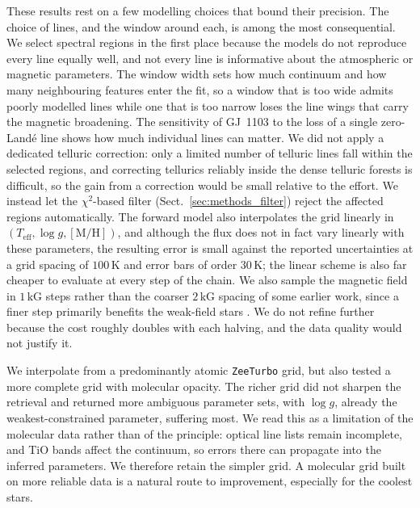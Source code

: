 
These results rest on a few modelling choices that bound their precision. The choice of lines, and the window around each, is among the most consequential. We select spectral regions in the first place because the models do not reproduce every line equally well, and not every line is informative about the atmospheric or magnetic parameters. The window width sets how much continuum and how many neighbouring features enter the fit, so a window that is too wide admits poorly modelled lines while one that is too narrow loses the line wings that carry the magnetic broadening. The sensitivity of GJ~1103 to the loss of a single zero-Landé line shows how much individual lines can matter. We did not apply a dedicated telluric correction: only a limited number of telluric lines fall within the selected regions, and correcting tellurics reliably inside the dense telluric forests is difficult, so the gain from a correction would be small relative to the effort. We instead let the $\chi^2$-based filter (Sect.~\ref{sec:methods_filter}) reject the affected regions automatically. The forward model also interpolates the grid linearly in $(T_\mathrm{eff}, \log g, \mathrm{[M/H]})$, and although the flux does not in fact vary linearly with these parameters, the resulting error is small against the reported uncertainties at a grid spacing of $100\,\mathrm{K}$ and error bars of order $30\,\mathrm{K}$; the linear scheme is also far cheaper to evaluate at every step of the chain. We also sample the magnetic field in $1\,\mathrm{kG}$ steps rather than the coarser $2\,\mathrm{kG}$ spacing of some earlier work, since a finer step primarily benefits the weak-field stars \citep{amateis_2026}. We do not refine further because the cost roughly doubles with each halving, and the data quality would not justify it.


We interpolate from a predominantly atomic \texttt{ZeeTurbo} grid, but also
tested a more complete grid with molecular opacity. The richer grid did not
sharpen the retrieval and returned more ambiguous parameter sets, with
$\log g$, already the weakest-constrained parameter, suffering most. We read
this as a limitation of the molecular data rather than of the principle:
optical line lists remain incomplete, and TiO bands affect the continuum, so
errors there can propagate into the inferred parameters. We therefore retain
the simpler grid. A molecular grid built on more reliable data is a natural
route to improvement, especially for the coolest stars.

